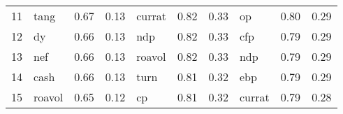 \documentclass[12pt]{article}
\begin{document}
\begin{landscape}
\begin{footnotesize}
\begin{longtable}{l|lcc|lcc|lcc}
			11                    & tang                        & 0.67                                                                                 & 0.13                            & currat                      & 0.82                                                                                 & 0.33                            & op                          & 0.80                                                                                 & 0.29                           \\
			12                    & dy                          & 0.66                                                                                 & 0.13                            & ndp                         & 0.82                                                                                 & 0.33                            & cfp                         & 0.79                                                                                 & 0.29                           \\
			13                    & nef                         & 0.66                                                                                 & 0.13                            & roavol                      & 0.82                                                                                 & 0.33                            & ndp                         & 0.79                                                                                 & 0.29                           \\
			14                    & cash                        & 0.66                                                                                 & 0.13                            & turn                        & 0.81                                                                                 & 0.32                            & ebp                         & 0.79                                                                                 & 0.29                           \\
			15                    & roavol                      & 0.65                                                                                 & 0.12                            & cp                          & 0.81                                                                                 & 0.32                            & currat                      & 0.79                                                                                 & 0.28                           \\

\end{longtable}
\end{footnotesize}
\end{landscape}
\end{document}
